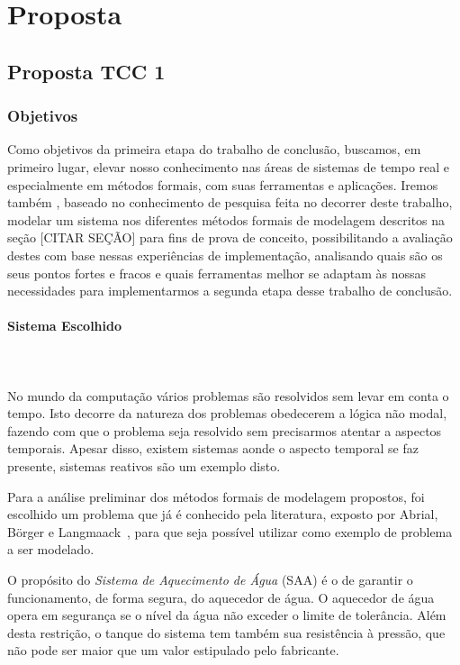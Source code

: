 \section{Proposta}
\subsection{Proposta TCC 1}
\subsubsection{Objetivos}
Como objetivos da primeira etapa do trabalho de conclusão, buscamos, em primeiro lugar,
elevar nosso conhecimento nas áreas de sistemas de tempo real e especialmente
em métodos formais, com suas ferramentas e aplicações. Iremos também ,
baseado no conhecimento de pesquisa feita no decorrer deste trabalho, modelar um sistema
nos diferentes métodos formais de modelagem descritos na seção [CITAR SEÇÃO] para fins de
prova de conceito, possibilitando a avaliação destes com base nessas experiências de implementação,
analisando quais são os seus pontos fortes e fracos e quais ferramentas melhor se adaptam às nossas
necessidades para implementarmos a segunda etapa desse trabalho de conclusão.
\\

\paragraph{Sistema Escolhido}\mbox{} \\\\
No mundo da computação vários problemas são resolvidos sem levar em conta o tempo.
Isto decorre da natureza dos problemas obedecerem a lógica não modal, fazendo com que o
problema seja resolvido sem precisarmos atentar a aspectos temporais. Apesar disso,
existem sistemas aonde o aspecto temporal se faz presente, sistemas reativos são um exemplo disto.

Para a análise preliminar dos métodos formais de modelagem propostos, foi escolhido um problema que
já é conhecido pela literatura, exposto por Abrial, B\"{o}rger e Langmaack~\cite{opac-b1092561},
para que seja possível utilizar como exemplo de problema a ser modelado.

O propósito do \textit{Sistema de Aquecimento de Água} (SAA) é o de garantir o funcionamento,
de forma segura, do aquecedor de água. O aquecedor de água opera em segurança se o nível da água
não exceder o limite de tolerância. Além desta restrição, o tanque do sistema tem também
sua resistência à pressão, que não pode ser maior que um valor estipulado pelo fabricante.

